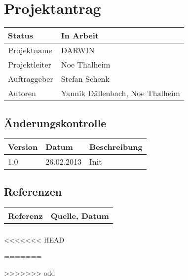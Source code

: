 \documentclass{scrartcl}
\begin{document}
	\section*{Projektantrag}
	
	\begin{tabularx}{\textwidth}{| X | X |}
	\hline
	Status & In Arbeit\\
	\hline
	Projektname & DARWIN\\
	\hline
	Projektleiter & Noe Thalheim\\
	\hline
	Auftraggeber & Stefan Schenk\\
	\hline
	Autoren & Yannik Dällenbach, Noe Thalheim\\
	\hline
	\end{tabularx}
	
	\subsection*{Änderungskontrolle}
	\begin{tabularx}{\textwidth}{| X | X | X |}
	\hline
	\rowcolor[gray]{0.9} Version & Datum & Beschreibung\\
	\hline
	1.0 & 26.02.2013 & Init\\
	\hline
	\end{tabularx}

	\subsection*{Referenzen}
	
	\begin{tabular}{| l | l | }
	\hline
	\rowcolor[gray]{0.9} Referenz & Quelle, Datum\\
	\hline
	 & \\
	 \hline
	\end{tabular}
	
	\pagebreak
	\tableofcontents
	\pagebreak
<<<<<<< HEAD
	
=======
	
	
>>>>>>> add
\end{document}

